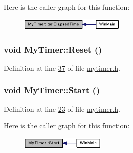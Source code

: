 Here is the caller graph for this function:\nopagebreak
\begin{figure}[H]
\begin{center}
\leavevmode
\includegraphics[width=144pt]{class_my_timer_abd0f6728cf64f7b5d81235588bb8e3c2_icgraph}
\end{center}
\end{figure}


\hypertarget{class_my_timer_ae616c920850e8d388f93f0d354b25ba5}{
\subsubsection[{Reset}]{\setlength{\rightskip}{0pt plus 5cm}void MyTimer::Reset ()}}
\label{class_my_timer_ae616c920850e8d388f93f0d354b25ba5}


Definition at line \hyperlink{mytimer_8h_source_l00037}{37} of file \hyperlink{mytimer_8h_source}{mytimer.h}.

\hypertarget{class_my_timer_a74b18b409d493579f6b3d0972590a7a6}{
\subsubsection[{Start}]{\setlength{\rightskip}{0pt plus 5cm}void MyTimer::Start ()}}
\label{class_my_timer_a74b18b409d493579f6b3d0972590a7a6}


Definition at line \hyperlink{mytimer_8h_source_l00023}{23} of file \hyperlink{mytimer_8h_source}{mytimer.h}.



Here is the caller graph for this function:\nopagebreak
\begin{figure}[H]
\begin{center}
\leavevmode
\includegraphics[width=116pt]{class_my_timer_a74b18b409d493579f6b3d0972590a7a6_icgraph}
\end{center}
\end{figure}




